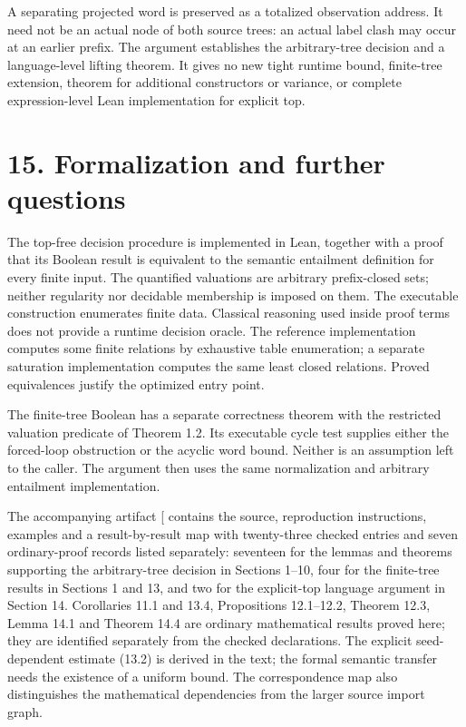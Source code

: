 \documentclass[
  11pt,
  a4paper,
]{article}
\begin{document}
A separating projected word is preserved as a totalized observation
address. It need not be an actual node of both source trees: an actual
label clash may occur at an earlier prefix. The argument establishes the
arbitrary-tree decision and a language-level lifting theorem. It gives
no new tight runtime bound, finite-tree extension, theorem for
additional constructors or variance, or complete expression-level Lean
implementation for explicit top.


\section{15. Formalization and further
questions}\label{formalization-and-further-questions}

The top-free decision procedure is implemented in Lean, together with a
proof that its Boolean result is equivalent to the semantic entailment
definition for every finite input. The quantified valuations are
arbitrary prefix-closed sets; neither regularity nor decidable
membership is imposed on them. The executable construction enumerates
finite data. Classical reasoning used inside proof terms does not
provide a runtime decision oracle. The reference implementation computes
some finite relations by exhaustive table enumeration; a separate
saturation implementation computes the same least closed relations.
Proved equivalences justify the optimized entry point.

The finite-tree Boolean has a separate correctness theorem with the
restricted valuation predicate of Theorem 1.2. Its executable cycle test
supplies either the forced-loop obstruction or the acyclic word bound.
Neither is an assumption left to the caller. The argument then uses the
same normalization and arbitrary entailment implementation.

The accompanying artifact {[}\citeproc{ref-SubtailArtifact}{10}{]}
contains the source, reproduction instructions, examples and a
result-by-result map with twenty-three checked entries and seven
ordinary-proof records listed separately: seventeen for the lemmas and
theorems supporting the arbitrary-tree decision in Sections 1--10, four
for the finite-tree results in Sections 1 and 13, and two for the
explicit-top language argument in Section 14. Corollaries 11.1 and 13.4,
Propositions 12.1--12.2, Theorem 12.3, Lemma 14.1 and Theorem 14.4 are
ordinary mathematical results proved here; they are identified
separately from the checked declarations. The explicit seed-dependent
estimate (13.2) is derived in the text; the formal semantic transfer
needs the existence of a uniform bound. The correspondence map also
distinguishes the mathematical dependencies from the larger source
import graph.
\end{document}

